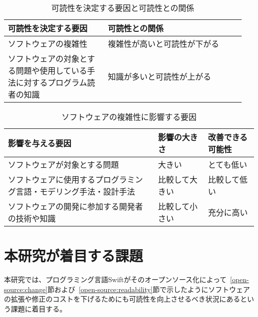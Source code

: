 \begin{table}[!hbtp]
    \begin{center}
        \caption{可読性を決定する要因と可読性との関係}
        \begin{tabular}{|p{0.4\linewidth}|p{0.55\linewidth}|}
            \hline
            可読性を決定する要因 & 可読性との関係 \\
            \hline
            \hline
            ソフトウェアの複雑性 & 複雑性が高いと可読性が下がる \\
            \hline
            ソフトウェアの対象とする問題や使用している手法に対するプログラム読者の知識 & 知識が多いと可読性が上がる \\
            \hline
        \end{tabular}
        \label{table:readability-relation}
    \end{center}
\end{table}

\begin{table}[!hbtp]
    \begin{center}
        \caption{ソフトウェアの複雑性に影響する要因}
        \begin{tabular}{|p{0.6\linewidth}|p{0.2\linewidth}|p{0.2\linewidth}|}
            \hline
            影響を与える要因 & 影響の大きさ & 改善できる可能性 \\
            \hline
            \hline
            ソフトウェアが対象とする問題 & 大きい & とても低い \\
            \hline
            ソフトウェアに使用するプログラミング言語・モデリング手法・設計手法 & 比較して大きい & 比較して低い \\
            \hline
            ソフトウェアの開発に参加する開発者の技術や知識 & 比較して小さい & 充分に高い \\
            \hline
        \end{tabular}
        \label{table:complexity-elements}
    \end{center}
\end{table}

\afterpage{\clearpage}
\section{本研究が着目する課題}
\label{open-source:issue}

本研究では、プログラミング言語Swiftがそのオープンソース化によって~\ref{open-source:change}節および~\ref{open-source:readability}節で示したようにソフトウェアの拡張や修正のコストを下げるためにも可読性を向上させるべき状況にあるという課題に着目する。

